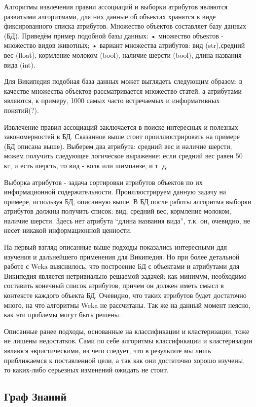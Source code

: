 Алгоритмы извлечения правил ассоциаций и выборки атрибутов являются развитыми алгоритмами,
для них данные об объектах хранятся в виде фиксированного списка атрибутов. Множество объектов
составляет базу данных (БД). Приведём пример подобной базы данных:
•	множество объектов - множество видов животных;
•	вариант множества атрибутов: вид (str),средний вес (float), кормление молоком (bool),
наличие шерсти (bool), длина названия вида (int).

Для Википедия подобная база данных может выглядеть следующим образом: в качестве множества
объектов рассматривается множество статей, а атрибутами являются, к примеру, 1000 самых часто
встречаемых и информативных понятий(?). 

Извлечение правил ассоциаций заключается в поиске интересных и полезных закономерностей в БД.
Сказанное выше стоит проиллюстрировать на примере (БД описана выше). Выберем два атрибута: средний 
вес и наличие шерсти, можем получить следующее логическое выражение: если средний вес равен 
50 кг, и есть шерсть, то вид - волк или шимпанзе, и т. д.

Выборка атрибутов - задача сортировки атрибутов объектов по их информационной содержательности.
Проиллюстрируем данную задачу на примере, используя БД, описанную выше. В БД после работы 
алгоритма выборки атрибутов должны получить список: вид, средний вес, кормление молоком, 
наличие шерсти. Здесь нет атрибута “длина названия вида”, т.к. он, очевидно, не несет
никакой информационной ценности.

На первый взгляд описанные выше подходы показались интересными ддя изучения и дальнейшего
применения для Википедия. Но при более детальной работе с Weka выяснилось, что
построение БД с объектами и атрибутами для Википедия является нетривиально решаемой задачей:
как минимум, необходимо составить конечный список атрибутов, причем он должен иметь смысл 
в контексте каждого объекта БД. Очевидно, что таких атрибутов будет достаточно много,
на что алгоритмы Weka не рассчитаны. Так же на данный момент неясно, как эти проблемы
могут быть решены.
 
Описанные ранее подходы, основанные на классификации и кластеризации, тоже не лишены недостатков.
Сами по себе алгоритмы классификации и кластеризации являюся эвристическими, из чего следует, что
в результате мы лишь приближаемся к поставленной цели, а так как они достаточно хорошо изучены, то 
каких-либо серьезных изменений ожидать не стоит.

\subsection {Граф Знаний}
 
